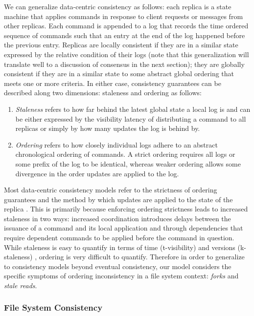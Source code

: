 \documentclass{article}
\begin{document}
We can generalize data-centric consistency as follows: each replica is a state machine that applies commands in response to client requests or messages from other replicas. Each command is appended to a log that records the time ordered sequence of commands such that an entry at the end of the log happened before the previous entry. Replicas are locally consistent if they are in a similar state expressed by the relative condition of their logs (note that this generalization will translate well to a discussion of consensus in the next section); they are globally consistent if they are in a similar state to some abstract global ordering that meets one or more criteria. In either case, consistency guarantees can be described along two dimensions: staleness and ordering as follows:

\begin{enumerate}
    \item \textit{Staleness} refers to how far behind the latest global state a local log is and can be either expressed by the visibility latency of distributing a command to all replicas or simply by how many updates the log is behind by.
    \item \textit{Ordering} refers to how closely individual logs adhere to an abstract chronological ordering of commands. A strict ordering requires all logs or some prefix of the log to be identical, whereas weaker ordering allows some divergence in the order updates are applied to the log.
\end{enumerate}

Most data-centric consistency models refer to the strictness of ordering guarantees and the method by which updates are applied to the state of the replica \cite{tanenbaum_distributed_2007}. This is primarily because enforcing ordering strictness leads to increased staleness in two ways: increased coordination introduces delays between the issuance of a command and its local application and through dependencies that require dependent commands to be applied before the command in question. While staleness is easy to quantify in terms of time (t-visibility) and versions (k-staleness) \cite{bailis_quantifying_2014}, ordering is very difficult to quantify. Therefore in order to generalize to consistency models beyond eventual consistency, our model considers the specific symptoms of ordering inconsistency in a file system context: \textit{forks} and \textit{stale reads}.

\subsubsection{File System Consistency}
\label{sec:fs_consistency}
\end{document}
